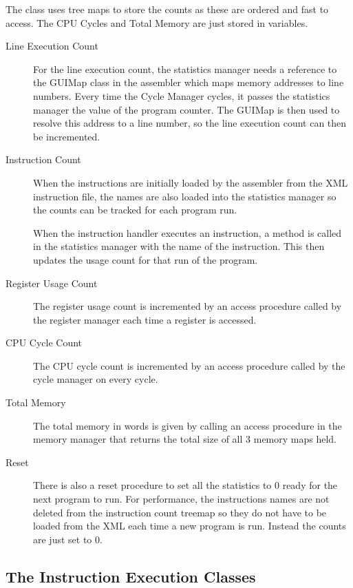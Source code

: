 The class uses tree maps to store the counts as these are ordered and fast to access.  The CPU Cycles and Total Memory are just stored in variables.

\begin{description}
\item[Line Execution Count]
For the line execution count, the statistics manager needs a reference to the GUIMap class in the assembler which maps memory addresses to line numbers.  Every time the Cycle Manager cycles, it passes the statistics manager the value of the program counter.  The GUIMap is then used to resolve this address to a line number, so the line execution count can then be incremented.

\item[Instruction Count]
When the instructions are initially loaded by the assembler from the XML instruction file, the names are also loaded into the statistics manager so the counts can be tracked for each program run.  

When the instruction handler executes an instruction, a method is called in the statistics manager with the name of the instruction.  This then updates the usage count for that run of the program.

\item[Register Usage Count]
The register usage count is incremented by an access procedure called by the register manager each time a register is accessed.

\item[CPU Cycle Count]
The CPU cycle count is incremented by an access procedure called by the cycle manager on every cycle.

\item[Total Memory]
The total memory in words is given by calling an access procedure in the memory manager that returns the total size of all 3 memory maps held.

\item[Reset]
There is also a reset procedure to set all the statistics to 0 ready for the next program to run.  For performance, the instructions names are not deleted from the instruction count treemap so they do not have to be loaded from the XML each time a new program is run. Instead the counts are just set to 0.
\end{description}



\subsection{The Instruction Execution Classes}

